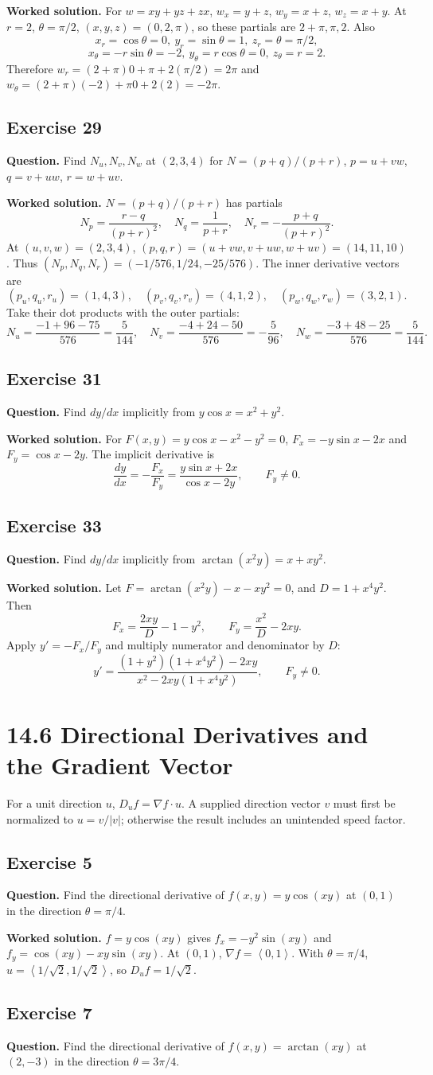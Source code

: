 \documentclass[11pt]{article}
\newcommand{\ex}[1]{\Needspace{8\baselineskip}\subsection*{Exercise #1}}
\newcommand{\ans}[1]{\boxed{#1}}
\newcommand{\vv}[1]{\left\langle #1\right\rangle}
\begin{document}
\textbf{Worked solution.}
For $w=xy+yz+zx$, $w_x=y+z$, $w_y=x+z$, $w_z=x+y$. At $r=2$, $\theta=\pi/2$, $(x,y,z)=(0,2,\pi)$, so these partials are $2+\pi,\pi,2$. Also
\[x_r=\cos\theta=0,\ y_r=\sin\theta=1,\ z_r=\theta=\pi/2,\]
\[x_\theta=-r\sin\theta=-2,\ y_\theta=r\cos\theta=0,\ z_\theta=r=2.\]
Therefore $\ans{w_r=(2+\pi)0+\pi+2(\pi/2)=2\pi}$ and $\ans{w_\theta=(2+\pi)(-2)+\pi0+2(2)=-2\pi}$.
\ex{29}
\textbf{Question.} Find $N_u,N_v,N_w$ at $(2,3,4)$ for $N=(p+q)/(p+r)$, $p=u+vw$, $q=v+uw$, $r=w+uv$.

\textbf{Worked solution.}
$N=(p+q)/(p+r)$ has partials
\[N_p=\frac{r-q}{(p+r)^2},\quad N_q=\frac1{p+r},\quad N_r=-\frac{p+q}{(p+r)^2}.\]
At $(u,v,w)=(2,3,4)$, $(p,q,r)=(u+vw,v+uw,w+uv)=(14,11,10)$. Thus $(N_p,N_q,N_r)=(-1/576,1/24,-25/576)$. The inner derivative vectors are
\[(p_u,q_u,r_u)=(1,4,3),\quad(p_v,q_v,r_v)=(4,1,2),\quad(p_w,q_w,r_w)=(3,2,1).\]
Take their dot products with the outer partials:
\[\ans{N_u=\frac{-1+96-75}{576}=\frac5{144}},\quad
\ans{N_v=\frac{-4+24-50}{576}=-\frac5{96}},\quad
\ans{N_w=\frac{-3+48-25}{576}=\frac5{144}}.\]
\ex{31}
\textbf{Question.} Find $dy/dx$ implicitly from $y\cos x=x^2+y^2$.

\textbf{Worked solution.}
For $F(x,y)=y\cos x-x^2-y^2=0$, $F_x=-y\sin x-2x$ and $F_y=\cos x-2y$. The implicit derivative is
\[\ans{\frac{dy}{dx}=-\frac{F_x}{F_y}=\frac{y\sin x+2x}{\cos x-2y}},\qquad F_y\ne0.\]
\ex{33}
\textbf{Question.} Find $dy/dx$ implicitly from $\arctan(x^2y)=x+xy^2$.

\textbf{Worked solution.}
Let $F=\arctan(x^2y)-x-xy^2=0$, and $D=1+x^4y^2$. Then
\[F_x=\frac{2xy}{D}-1-y^2,\qquad F_y=\frac{x^2}{D}-2xy.\]
Apply $y'=-F_x/F_y$ and multiply numerator and denominator by $D$:
\[\ans{y'=\frac{(1+y^2)(1+x^4y^2)-2xy}{x^2-2xy(1+x^4y^2)}},\qquad F_y\ne0.\]
\clearpage\section*{14.6 Directional Derivatives and the Gradient Vector}
\noindent For a unit direction $u$, $D_uf=\nabla f\cdot u$. A supplied direction vector $v$ must first be normalized to $u=v/|v|$; otherwise the result includes an unintended speed factor.
\ex{5}
\textbf{Question.} Find the directional derivative of $f(x,y)=y\cos(xy)$ at $(0,1)$ in the direction $\theta=\pi/4$.

\textbf{Worked solution.}
$f=y\cos(xy)$ gives $f_x=-y^2\sin(xy)$ and $f_y=\cos(xy)-xy\sin(xy)$. At $(0,1)$, $\nabla f=\vv{0,1}$. With $\theta=\pi/4$, $u=\vv{1/\sqrt2,1/\sqrt2}$, so $\ans{D_uf=1/\sqrt2}$.
\ex{7}
\textbf{Question.} Find the directional derivative of $f(x,y)=\arctan(xy)$ at $(2,-3)$ in the direction $\theta=3\pi/4$.
\end{document}
